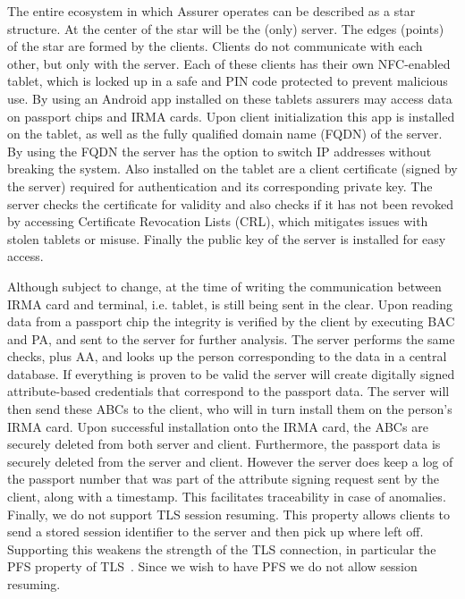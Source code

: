 The entire ecosystem in which Assurer operates can be described as a star structure. At the center of the star will be the (only) server. The edges (points) of the star are formed by the clients. Clients do not communicate with each other, but only with the server. Each of these clients has their own NFC-enabled tablet, which is locked up in a safe and PIN code protected to prevent malicious use. By using an Android app installed on these tablets assurers may access data on passport chips and IRMA cards. Upon client initialization this app is installed on the tablet, as well as the fully qualified domain name (FQDN) of the server. By using the FQDN the server has the option to switch IP addresses without breaking the system. Also installed on the tablet are a client certificate (signed by the server) required for authentication and its corresponding private key. The server checks the certificate for validity and also checks if it has not been revoked by accessing Certificate Revocation Lists (CRL), which mitigates issues with stolen tablets or misuse. Finally the public key of the server is installed for easy access.

Although subject to change, at the time of writing the communication between IRMA card and terminal, i.e. tablet, is still being sent in the clear. Upon reading data from a passport chip the integrity is verified by the client by executing BAC and PA, and sent to the server for further analysis. The server performs the same checks, plus AA, and looks up the person corresponding to the data in a central database. If everything is proven to be valid the server will create digitally signed attribute-based credentials that correspond to the passport data. The server will then send these ABCs to the client, who will in turn install them on the person's IRMA card. Upon successful installation onto the IRMA card, the ABCs are securely deleted from both server and client. Furthermore, the passport data is securely deleted from the server and client. However the server does keep a log of the passport number that was part of the attribute signing request sent by the client, along with a timestamp. This facilitates traceability in case of anomalies. Finally, we do not support TLS session resuming. This property allows clients to send a stored session identifier to the server and then pick up where left off. Supporting this weakens the strength of the TLS connection, in particular the PFS property of TLS~\cite{tlssesres}. Since we wish to have PFS we do not allow session resuming.

